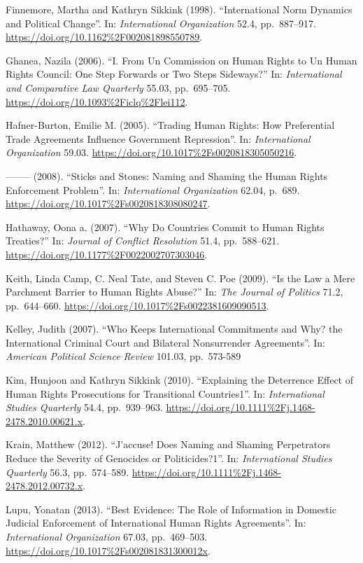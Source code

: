 \documentclass[10pt,]{article}
\begin{document}
Finnemore, Martha and Kathryn Sikkink (1998). ``International Norm
Dynamics and Political Change''. In: \emph{International Organization}
52.4, pp.~887--917. \url{https://doi.org/10.1162\%2F002081898550789}.

Ghanea, Nazila (2006). ``I. From Un Commission on Human Rights to Un
Human Rights Council: One Step Forwards or Two Steps Sideways?'' In:
\emph{International and Comparative Law Quarterly} 55.03, pp.~695--705.
\url{https://doi.org/10.1093\%2Ficlq\%2Flei112}.

Hafner-Burton, Emilie M. (2005). ``Trading Human Rights: How
Preferential Trade Agreements Influence Government Repression''. In:
\emph{International Organization} 59.03.
\url{https://doi.org/10.1017\%2Fs0020818305050216}.

-------- (2008). ``Sticks and Stones: Naming and Shaming the Human
Rights Enforcement Problem''. In: \emph{International Organization}
62.04, p.~689. \url{https://doi.org/10.1017\%2Fs0020818308080247}.

Hathaway, Oona a. (2007). ``Why Do Countries Commit to Human Rights
Treaties?'' In: \emph{Journal of Conflict Resolution} 51.4,
pp.~588--621. \url{https://doi.org/10.1177\%2F0022002707303046}.

Keith, Linda Camp, C. Neal Tate, and Steven C. Poe (2009). ``Is the Law
a Mere Parchment Barrier to Human Rights Abuse?'' In:
\emph{The Journal of Politics} 71.2, pp.~644--660.
\url{https://doi.org/10.1017\%2Fs0022381609090513}.

Kelley, Judith (2007). ``Who Keeps International Commitments and Why?
the International Criminal Court and Bilateral Nonsurrender
Agreements''. In: \emph{American Political Science Review} 101.03,
pp.~573-589

Kim, Hunjoon and Kathryn Sikkink (2010). ``Explaining the Deterrence
Effect of Human Rights Prosecutions for Transitional Countries1''. In:
\emph{International Studies Quarterly} 54.4, pp.~939--963.
\url{https://doi.org/10.1111\%2Fj.1468-2478.2010.00621.x}.

Krain, Matthew (2012). ``J'accuse! Does Naming and Shaming Perpetrators
Reduce the Severity of Genocides or Politicides?1''. In:
\emph{International Studies Quarterly} 56.3, pp.~574--589.
\url{https://doi.org/10.1111\%2Fj.1468-2478.2012.00732.x}.

Lupu, Yonatan (2013). ``Best Evidence: The Role of Information in
Domestic Judicial Enforcement of International Human Rights
Agreements''. In: \emph{International Organization} 67.03, pp.~469--503.
\url{https://doi.org/10.1017\%2Fs002081831300012x}.
\end{document}
